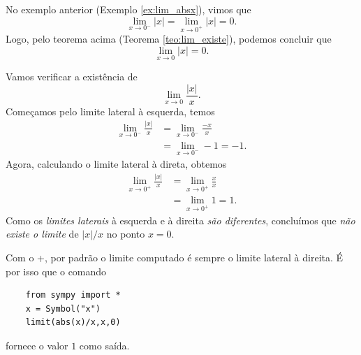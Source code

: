 \begin{exer}
  No exemplo anterior (Exemplo \ref{ex:lim_absx}), vimos que
  \begin{equation}
    \lim_{x\to 0^-} |x| = \lim_{x\to 0^+} |x| = 0.
  \end{equation}
  Logo, pelo teorema acima (Teorema \ref{teo:lim_existe}), podemos concluir que
  \begin{equation}
    \lim_{x\to 0} |x| = 0.
  \end{equation}
\end{exer}

\begin{exer}
  Vamos verificar a existência de
  \begin{equation}
    \lim_{x\to 0} \frac{|x|}{x}.
  \end{equation}
  Começamos pelo limite lateral à esquerda, temos
  \begin{align}
    \lim_{x\to 0^-} \frac{|x|}{x} &= \lim_{x\to 0^-} \frac{-x}{x}\\
    &= \lim_{x\to 0^-} -1 = -1.
  \end{align}
  Agora, calculando o limite lateral à direta, obtemos
  \begin{align}
    \lim_{x\to 0^+} \frac{|x|}{x} &= \lim_{x\to 0^+} \frac{x}{x}\\
    &= \lim_{x\to 0^+} 1 = 1.
  \end{align}
  Como os \emph{limites laterais} à esquerda e à direita \emph{são diferentes}, concluímos que \emph{não existe o limite} de $|x|/x$ no ponto $x=0$.

  \ifispython
  Com o {\python}+{\sympy}, por padrão o limite computado é sempre o limite lateral à direita. É por isso que o comando
  \begin{lstlisting}
    from sympy import *
    x = Symbol("x")
    limit(abs(x)/x,x,0)
  \end{lstlisting}
  fornece o valor $1$ como saída.
  \fi
\end{exer}

